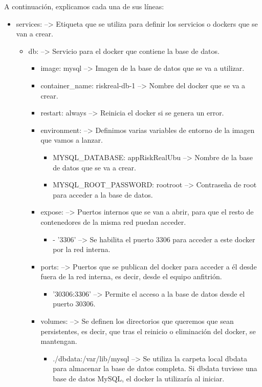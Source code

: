 A continuación, explicamos cada una de sus líneas:
\begin{itemize}
	\item services: --> Etiqueta que se utiliza para definir los servicios o dockers que se van a crear.
	\begin{itemize}
		\item db: --> Servicio para el docker que contiene la base de datos.
		\begin{itemize}
			\item image: mysql --> Imagen de la base de datos que se va a utilizar.
			\item container\_name: riskreal-db-1 --> Nombre del docker que se va a crear.
			\item restart: always --> Reinicia el docker si se genera un error.
			\item environment: --> Definimos varias variables de entorno de la imagen que vamos a lanzar.
			\begin{itemize}
				\item MYSQL\_DATABASE: appRiskRealUbu --> Nombre de la base de datos que se va a crear.
				\item MYSQL\_ROOT\_PASSWORD: rootroot --> Contraseña de root para acceder a la base de datos.
			\end{itemize}
			\item expose: --> Puertos internos que se van a abrir, para que el resto de contenedores de la misma red puedan acceder.
			\begin{itemize}
				\item - '3306' --> Se habilita el puerto 3306 para acceder a este docker por la red interna.
			\end{itemize}
			\item ports: --> Puertos que se publican del docker para acceder a él desde fuera de la red interna, es decir, desde el equipo anfitrión.
			\begin{itemize}
				\item '30306:3306' --> Permite el acceso a la base de datos desde el puerto 30306.
			\end{itemize}
			\item volumes: --> Se definen los directorios que queremos que sean persistentes, es decir, que tras el reinicio o eliminación del docker, se mantengan.
			\begin{itemize}
				\item ./dbdata:/var/lib/mysql --> Se utiliza la carpeta local dbdata para almacenar la base de datos completa. Si dbdata tuviese una base de datos MySQL, el docker la utilizaría al iniciar.

\end{itemize}
\end{itemize}
\end{itemize}
\end{itemize}

